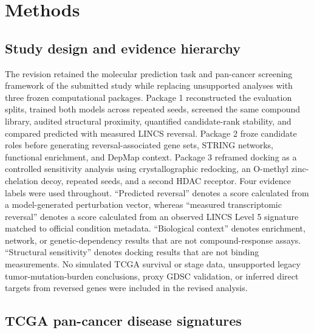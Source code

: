 \section{Methods}

\subsection{Study design and evidence hierarchy}

The revision retained the molecular prediction task and pan-cancer screening framework of the submitted study while replacing unsupported analyses with three frozen computational packages. Package 1 reconstructed the evaluation splits, trained both models across repeated seeds, screened the same compound library, audited structural proximity, quantified candidate-rank stability, and compared predicted with measured LINCS reversal. Package 2 froze candidate roles before generating reversal-associated gene sets, STRING networks, functional enrichment, and DepMap context. Package 3 reframed docking as a controlled sensitivity analysis using crystallographic redocking, an O-methyl zinc-chelation decoy, repeated seeds, and a second HDAC receptor. Four evidence labels were used throughout. ``Predicted reversal'' denotes a score calculated from a model-generated perturbation vector, whereas ``measured transcriptomic reversal'' denotes a score calculated from an observed LINCS Level 5 signature matched to official condition metadata. ``Biological context'' denotes enrichment, network, or genetic-dependency results that are not compound-response assays. ``Structural sensitivity'' denotes docking results that are not binding measurements. No simulated TCGA survival or stage data, unsupported legacy tumor-mutation-burden conclusions, proxy GDSC validation, or inferred direct targets from reversed genes were included in the revised analysis.

\subsection{TCGA pan-cancer disease signatures}

